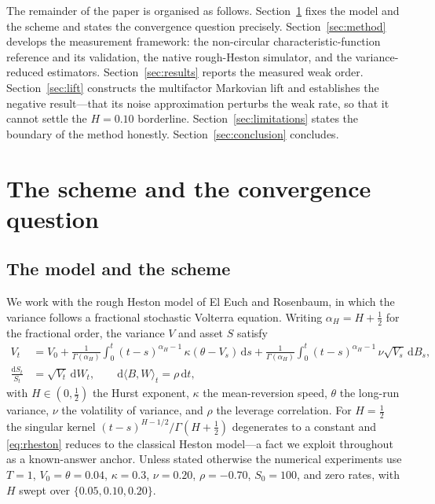 \documentclass{siamonline250211}
\begin{document}
The remainder of the paper is organised as follows.
Section~\ref{sec:scheme} fixes the model and the scheme and states the convergence
question precisely. Section~\ref{sec:method} develops the measurement framework:
the non-circular characteristic-function reference and its validation, the native
rough-Heston simulator, and the variance-reduced estimators.
Section~\ref{sec:results} reports the measured weak order.
Section~\ref{sec:lift} constructs the multifactor Markovian lift and establishes the
negative result---that its noise approximation perturbs the weak rate, so that it
cannot settle the $H=0.10$ borderline.
Section~\ref{sec:limitations} states the boundary of the method honestly.
Section~\ref{sec:conclusion} concludes.

\section{The scheme and the convergence question}\label{sec:scheme}

\subsection{The model and the scheme}

We work with the rough Heston model of El Euch and Rosenbaum, in which the variance
follows a fractional stochastic Volterra equation. Writing $\alpha_{\!H}=H+\tfrac12$
for the fractional order, the variance $V$ and asset $S$ satisfy
\begin{align}
V_t &= V_0 + \frac{1}{\Gamma(\alpha_{\!H})}\int_0^t (t-s)^{\alpha_{\!H}-1}\,
       \kappa(\theta - V_s)\,\mathrm{d}s
     + \frac{1}{\Gamma(\alpha_{\!H})}\int_0^t (t-s)^{\alpha_{\!H}-1}\,
       \nu\sqrt{V_s}\,\mathrm{d}B_s, \label{eq:rheston}\\
\frac{\mathrm{d}S_t}{S_t} &= \sqrt{V_t}\,\mathrm{d}W_t,
\qquad \mathrm{d}\langle B,W\rangle_t = \rho\,\mathrm{d}t,
\end{align}
with $H\in(0,\tfrac12)$ the Hurst exponent, $\kappa$ the mean-reversion speed,
$\theta$ the long-run variance, $\nu$ the volatility of variance, and $\rho$ the
leverage correlation. For $H=\tfrac12$ the singular kernel
$(t-s)^{H-1/2}/\Gamma(H+\tfrac12)$ degenerates to a constant and \eqref{eq:rheston}
reduces to the classical Heston model---a fact we exploit throughout as a known-answer
anchor. Unless stated otherwise the numerical experiments use
$T=1$, $V_0=\theta=0.04$, $\kappa=0.3$, $\nu=0.20$, $\rho=-0.70$, $S_0=100$, and zero
rates, with $H$ swept over $\{0.05,0.10,0.20\}$.
\end{document}
